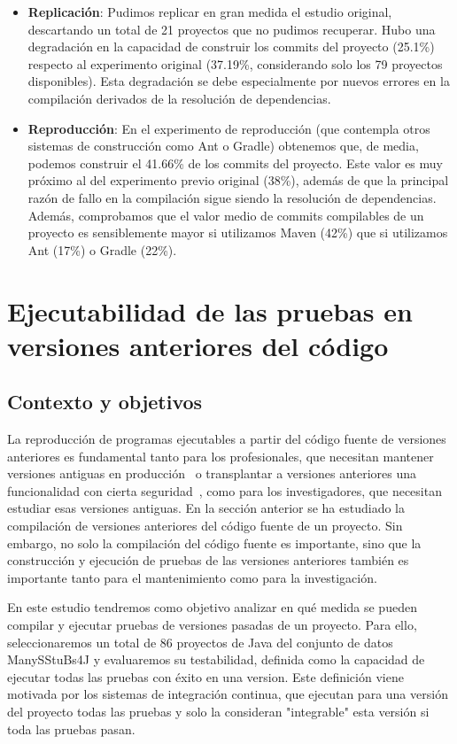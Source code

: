 \begin{itemize}
    \item \textbf{Replicación}: Pudimos replicar en gran medida el estudio original, descartando un total de 21 proyectos que no pudimos recuperar. 
    Hubo una degradación en la capacidad de construir los commits del proyecto (25.1\%) respecto al experimento original (37.19\%, considerando solo los 79 proyectos disponibles). Esta degradación se debe especialmente por nuevos errores en la compilación derivados de la resolución de dependencias.
    \item \textbf{Reproducción}: En el experimento de reproducción (que contempla otros sistemas de construcción como Ant o Gradle) obtenemos que, de media, podemos construir el 41.66\% de los commits del proyecto. Este valor es muy próximo al del experimento previo original (38\%), además de que la principal razón de fallo en la compilación sigue siendo la resolución de dependencias. Además, comprobamos que el valor medio de commits compilables de un proyecto es sensiblemente mayor si utilizamos Maven (42\%) que si utilizamos Ant (17\%) o Gradle (22\%).
\end{itemize}

\section{Ejecutabilidad de las pruebas en versiones anteriores del código}
\label{sec:resumen:testability}

\subsection{Contexto y objetivos}

La reproducción de programas ejecutables a partir del código fuente de versiones anteriores es fundamental tanto para los profesionales, que necesitan mantener versiones antiguas en producción~\cite{bartelsoftware} o transplantar a versiones anteriores una funcionalidad con cierta seguridad~\cite{tian2017mining}, como para los investigadores, que necesitan estudiar esas versiones antiguas. 
En la sección anterior se ha estudiado la compilación de versiones anteriores del código fuente de un proyecto.
Sin embargo, no solo la compilación del código fuente es importante, sino que la construcción y ejecución de pruebas de las versiones anteriores también es importante tanto para el mantenimiento como para la investigación.

En este estudio tendremos como objetivo analizar en qué medida se pueden compilar y ejecutar pruebas de versiones pasadas de un proyecto. 
Para ello, seleccionaremos un total de 86 proyectos de Java del conjunto de datos ManySStuBs4J y evaluaremos su testabilidad, definida como la capacidad de ejecutar todas las pruebas con éxito en una version. Este definición viene motivada por los sistemas de integración continua, que ejecutan para una versión del proyecto todas las pruebas y solo la consideran "integrable" esta versión si toda las pruebas pasan.

